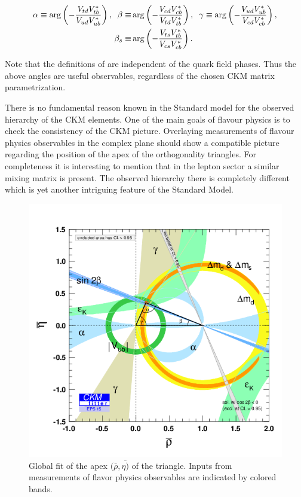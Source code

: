\begin{align}
  \centering
  \alpha \equiv \arg\left( -\frac{\Vtd\Vtb^*}{\Vud\Vub^*} \right),
  \;\;
  \beta  \equiv & \arg\left( -\frac{\Vcd\Vcb^*}{\Vtd\Vtb^*} \right),
  \;\;
  \gamma \equiv \arg\left( -\frac{\Vud\Vub^*}{\Vcd\Vcb^*} \right), \nonumber \\
  \betas \equiv & \arg\left( -\frac{\Vts\Vtb^*}{\Vcs\Vcb^*} \right).
  \label{ckm_angles_def}
\end{align}

\noindent Note that the definitions of  are independent of
the quark field phases. Thus the above angles are useful observables, regardless of the chosen
CKM matrix parametrization.

There is no fundamental reason known in the Standard model for the observed hierarchy of the CKM elements.
One of the main goals of flavour physics is to check the consistency of the CKM picture.
Overlaying measurements of flavour physics observables in the complex plane should show a compatible
picture regarding the position of the apex of the orthogonality triangles.
For completeness it is interesting to mention that in the lepton sector a similar mixing matrix is present.
The observed hierarchy there is completely different which is yet another intriguing feature of the Standard Model.

\begin{figure}[!h]
  \centering
    \includegraphics[trim=0cm 0.5cm 0cm 1.5cm, clip=true, width=\textwidth]{Figures/Chapter1/rhoeta_large.png}
    \caption{Global fit of the apex $(\bar{\rho},\bar{\eta)}$ of the \Bd triangle\cite{ckm-fitter-phis-pred}.
             Inputs from measurements of flavor physics observables are indicated by colored bands.}
    \label{unitarity_triangle}
\end{figure}

